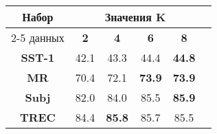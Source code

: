 \vspace{5mm}
\begin{minipage}{\linewidth}
\begin{center}
 \label{tab:title} 
\begin{tabular}{|c|c|c|c|c|c|}
\hline
\multirow{2}{*}{Набор}   &  \multicolumn{4}{c|}{Значения K} \\ \cline{2-5} 
     данных              &  \textbf{2}& \textbf{4}   & \textbf{6} & \textbf{8} \\ \hline
\textbf{SST-1}           & 42.1       & 43.3  & 44.4  & \textbf{44.8}     \\ \hline
\textbf{MR}              & 70.4       & 72.1  & \textbf{73.9}     & \textbf{73.9}     \\ \hline
\textbf{Subj}            & 82.0       & 84.0  & 85.5              & \textbf{85.9} \\ \hline
\textbf{TREC}            & 84.4       & \textbf{85.8}& 85.7     & 85.5     \\ \hline
\end{tabular}
\end{center}
\end{minipage}
\vspace{5mm}